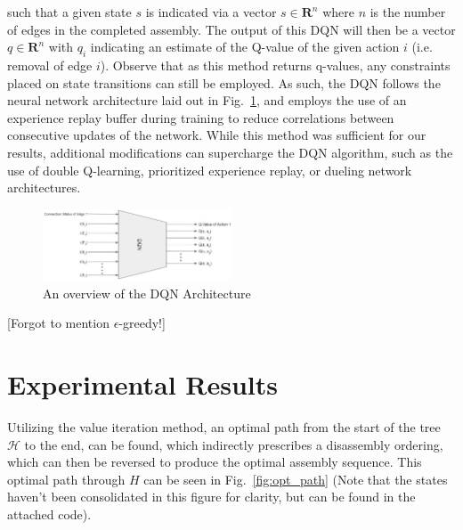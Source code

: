 \documentclass{article}
\begin{document}
such that a given state $s$ is indicated via a vector $s \in \mathbf{R}^n$ where $n$ is the number of edges in the completed assembly. The output of this DQN will then be a vector $q \in \mathbf{R}^n$ with $q_i$ indicating an estimate of the Q-value of the given action $i$ (i.e. removal of edge $i$). Observe that as this method returns q-values, any constraints placed on state transitions can still be employed. As such, the DQN follows the neural network architecture laid out in Fig.~\ref{fig: DQN}, and employs the use of an experience replay buffer during training to reduce correlations between consecutive updates of the network. While this method was sufficient for our results, additional modifications can supercharge the DQN algorithm, such as the use of double Q-learning, prioritized experience replay, or dueling network architectures.

\begin{figure}[!htb]
\centering
\includegraphics[width=0.5\textwidth]{figs/DQN Architecture.jpg}
  \caption{An overview of the DQN Architecture}\label{fig: DQN}
\end{figure}

{\color{red}[Forgot to mention $\epsilon$-greedy!]}


\section{Experimental Results}

Utilizing the value iteration method, an optimal path from the start of the tree $\mathcal{H}$ to the end, can be found, which indirectly prescribes a disassembly ordering, which can then be reversed to produce the optimal assembly sequence. This optimal path through $H$ can be seen in Fig.~\ref{fig:opt_path} (Note that the states haven't been consolidated in this figure for clarity, but can be found in the attached code).
\end{document}
